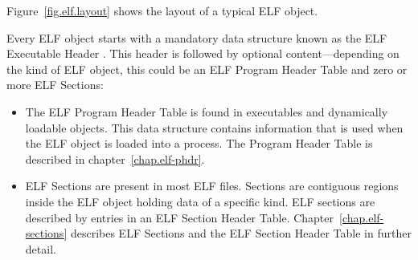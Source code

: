 \documentclass[a4paper,pdftex]{book}
\newcommand{\elfdatastructure}[1]{\textsf{#1}}
\begin{document}
Figure~\vref{fig.elf.layout} shows the layout of a typical ELF object.

Every ELF object starts with a mandatory data structure known as the
ELF \elfdatastructure{Executable Header}
. This header is followed by optional
content---depending on the kind of ELF object, this could be an ELF
\elfdatastructure{Program Header Table}
and zero or more ELF \elfdatastructure{Sections}:

\begin{itemize}
\item The ELF \elfdatastructure{Program Header
  Table} is found in executables and
  dynamically loadable objects.  This data structure contains
  information that is used when the ELF object is loaded into a
  process.  The Program Header Table is
  described in chapter~\vref{chap.elf-phdr}.
\item ELF \elfdatastructure{Sections} are present in
  most ELF files. Sections are contiguous regions inside the ELF
  object holding data of a specific kind. ELF sections are described
  by entries in an ELF \elfdatastructure{Section Header
    Table}.
  Chapter~\vref{chap.elf-sections} describes ELF
  \elfdatastructure{Sections} and the ELF \elfdatastructure{Section
    Header Table} in further detail.
\end{itemize}
\end{document}
